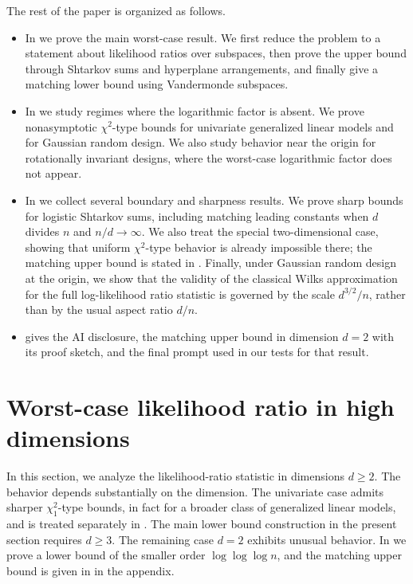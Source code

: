 \documentclass[11pt, letterpaper, hidelinks]{article}
\newcommand{\1}{\mathbf 1}
\renewcommand{\ge}{\geqslant}
\theoremstyle{plain}
\theoremstyle{definition}
\begin{document}
The rest of the paper is organized as follows.
\begin{itemize}
\item In  we prove the main worst-case result. We first
reduce the problem to a statement about likelihood ratios over subspaces, then
prove the upper bound through Shtarkov sums and hyperplane arrangements, and
finally give a matching lower bound using Vandermonde subspaces.

\item In  we study regimes where the logarithmic
factor is absent. We prove nonasymptotic \(\chi^2\)-type bounds for
univariate generalized linear models and for Gaussian random design. We also
study behavior near the origin for rotationally invariant designs, where the
worst-case logarithmic factor does not appear.

\item In  we collect several boundary and
sharpness results. We prove sharp bounds for logistic Shtarkov sums, including
matching leading constants when $d$ divides $n$ and $n/d\to\infty$. We also
treat the special two-dimensional case, showing that uniform \(\chi^2\)-type
behavior is already impossible there; the matching upper bound is stated in
. Finally, under Gaussian random design at the origin, we show that the validity
of the classical Wilks approximation for the full log-likelihood ratio statistic
is governed by the scale \(d^{3/2}/n\), rather than by the usual aspect ratio
\(d/n\).

\item {} gives the AI disclosure, the matching upper bound in dimension \(d=2\) with its proof sketch, and the final prompt used in our tests for that result. 
\end{itemize}




\section{Worst-case likelihood ratio in high dimensions}
\label{sec:log-reg}

In this section, we analyze the likelihood-ratio statistic in dimensions
\(d\ge 2\). The behavior depends substantially on the dimension. The
univariate case admits sharper \(\chi^2_1\)-type bounds, in fact for a broader
class of generalized linear models, and is treated separately in
. The main lower bound construction in the present
section requires \(d\ge 3\). The remaining case \(d=2\) exhibits unusual
behavior. In  we prove a lower bound of the smaller order
\(\log\log\log n\), and the matching upper bound is given in
 in the appendix.
\end{document}
